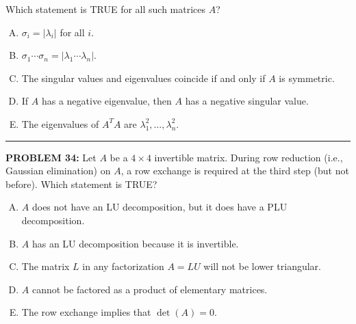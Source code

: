 \documentclass[12pt]{amsart}
\newcommand{\divider}{
  \vspace{-1em} %
  \noindent
  \raisebox{-0.15ex}{\textbullet}%
  \hspace{0.5em}%
  \rule[0.5ex]{0.95\textwidth}{1.0pt}%
  \hspace{0.5em}%
  \raisebox{-0.15ex}{\textbullet}%
  \vspace{0em} %
}
\begin{document}
{Which statement is TRUE for all such matrices $A$?

\begin{enumerate}[(A)]
\item $\sigma_i = |\lambda_i|$ for all $i$.
\item $\sigma_1 \cdots \sigma_n = |\lambda_1 \cdots \lambda_n|$.
\item The singular values and eigenvalues coincide if and only if $A$ is symmetric.
\item If $A$ has a negative eigenvalue, then $A$ has a negative singular value.
\item The eigenvalues of $A^T A$ are $\lambda_1^2, \ldots, \lambda_n^2$.
\end{enumerate}

%
%

\divider



{\bf PROBLEM 34:}
% 
Let $A$ be a $4 \times 4$ invertible matrix. During row reduction (i.e., Gaussian elimination) on $A$, a row exchange 
is required at the third step (but not before). Which statement is TRUE?

\begin{enumerate}[(A)]
\item $A$ does not have an LU decomposition, but it does have a PLU decomposition.
\item $A$ has an LU decomposition because it is invertible.
\item The matrix $L$ in any factorization $A = LU$ will not be lower triangular.
\item $A$ cannot be factored as a product of elementary matrices.
\item The row exchange implies that $\det(A) = 0$.
\end{enumerate}

}
\end{document}
